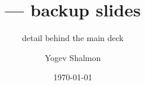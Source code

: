 %


\title[GPAP backup]{\GPAP{} --- backup slides}
\subtitle{detail behind the main deck}
\author[Y. Shalmon]{Yogev Shalmon}
\date{\today}



\begin{frame}[plain]
  \titlepage
\end{frame}

